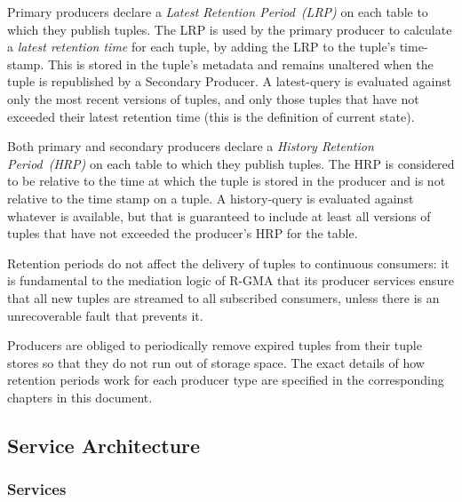 Primary producers declare a \textit{Latest Retention
Period}~\textit{(LRP)} on each table to which they publish
tuples.  The LRP is used by the primary producer to calculate a \textit{latest
retention time} for each tuple, by adding the LRP to the tuple's
time-stamp. This is stored in the tuple's metadata and remains unaltered
when the tuple is republished by a Secondary Producer. A latest-query is evaluated against only the most recent versions of
tuples, and only those tuples that have not exceeded their latest
retention time (this is the definition of current state).

Both primary and secondary producers declare a \textit{History Retention
Period}~\textit{(HRP)} on each table to which they publish
tuples. The HRP is considered to be relative to the time at which the tuple is
stored in the producer and is not relative to the time stamp on a tuple.
A history-query is evaluated against whatever is available, but that
is guaranteed to include at least all versions of tuples that have not
exceeded the producer's HRP for the table.

Retention periods do not affect the delivery of tuples to continuous consumers:
it is fundamental to the mediation logic of R-GMA that its producer services
ensure that all new tuples are streamed to all subscribed consumers, unless
there is an unrecoverable fault that prevents it.

Producers are obliged to periodically remove expired tuples from their tuple
stores so that they do not run out of storage space. The exact details of how
retention periods work for each producer type
are specified in the corresponding chapters in this document.

\subsection{Service Architecture}\label{sec:wsa}
\subsubsection{Services}

